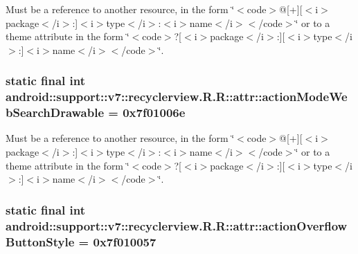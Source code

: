 Must be a reference to another resource, in the form \char`\"{}$<$code$>$@\mbox{[}+\mbox{]}\mbox{[}$<$i$>$package$<$/i$>$:\mbox{]}$<$i$>$type$<$/i$>$:$<$i$>$name$<$/i$>$$<$/code$>$\char`\"{} or to a theme attribute in the form \char`\"{}$<$code$>$?\mbox{[}$<$i$>$package$<$/i$>$:\mbox{]}\mbox{[}$<$i$>$type$<$/i$>$:\mbox{]}$<$i$>$name$<$/i$>$$<$/code$>$\char`\"{}. \hypertarget{classandroid_1_1support_1_1v7_1_1recyclerview_1_1_r_1_1attr_157a4c15921837e3e8d9ac4aba431440}{
\subsubsection[{actionModeWebSearchDrawable}]{\setlength{\rightskip}{0pt plus 5cm}static final int android::support::v7::recyclerview.R.R::attr::actionModeWebSearchDrawable = 0x7f01006e}}
\label{classandroid_1_1support_1_1v7_1_1recyclerview_1_1_r_1_1attr_157a4c15921837e3e8d9ac4aba431440}


Must be a reference to another resource, in the form \char`\"{}$<$code$>$@\mbox{[}+\mbox{]}\mbox{[}$<$i$>$package$<$/i$>$:\mbox{]}$<$i$>$type$<$/i$>$:$<$i$>$name$<$/i$>$$<$/code$>$\char`\"{} or to a theme attribute in the form \char`\"{}$<$code$>$?\mbox{[}$<$i$>$package$<$/i$>$:\mbox{]}\mbox{[}$<$i$>$type$<$/i$>$:\mbox{]}$<$i$>$name$<$/i$>$$<$/code$>$\char`\"{}. \hypertarget{classandroid_1_1support_1_1v7_1_1recyclerview_1_1_r_1_1attr_e6283fcee05515dca6f75f9ba59e9a18}{
\subsubsection[{actionOverflowButtonStyle}]{\setlength{\rightskip}{0pt plus 5cm}static final int android::support::v7::recyclerview.R.R::attr::actionOverflowButtonStyle = 0x7f010057}}
\label{classandroid_1_1support_1_1v7_1_1recyclerview_1_1_r_1_1attr_e6283fcee05515dca6f75f9ba59e9a18}


